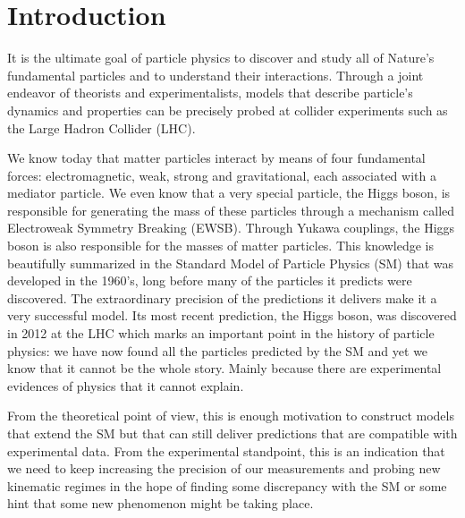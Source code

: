 
\chapter{Introduction}
\label{chapter:introduction}

It is the ultimate goal of particle physics to discover and study all of Nature's fundamental particles and to understand their interactions. Through a joint endeavor of theorists and experimentalists, models that describe particle's dynamics and properties can be precisely probed at collider experiments such as the Large Hadron Collider (LHC). 

We know today that matter particles interact by means of four fundamental forces: electromagnetic, weak, strong and gravitational, each associated with a mediator particle. We even know that a very special particle, the Higgs boson, is responsible for generating the mass of these particles through a mechanism called Electroweak Symmetry Breaking (EWSB). Through Yukawa couplings, the Higgs boson is also responsible for the masses of matter particles. This knowledge is beautifully summarized in the Standard Model of Particle Physics (SM) that was developed in the 1960's, long before many of the particles it predicts were discovered. The extraordinary precision of the predictions it delivers make it a very successful model. Its most recent prediction, the Higgs boson, was discovered in 2012 at the LHC which marks an important point in the history of particle physics: we have now found all the particles predicted by the SM and yet we know that it cannot be the whole story. Mainly because there are experimental evidences of physics that it cannot explain.

From the theoretical point of view, this is enough motivation to construct models that extend the SM but that can still deliver predictions that are compatible with experimental data. From the experimental standpoint, this is an indication that we need to keep increasing the precision of our measurements and probing new kinematic regimes in the hope of finding some discrepancy with the SM or some hint that some new phenomenon might be taking place.

